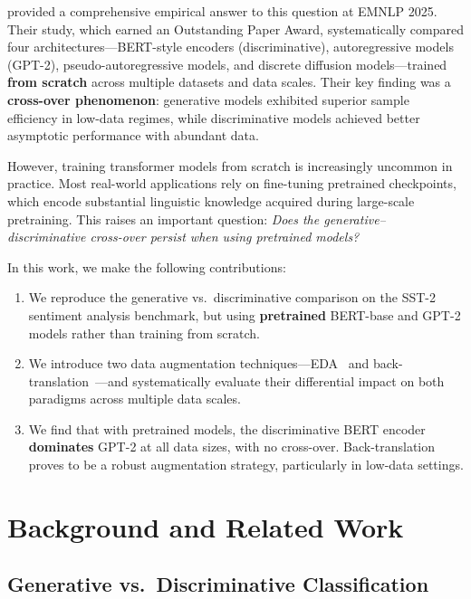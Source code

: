 \documentclass[11pt,a4paper]{article}
\begin{document}
\citet{kasa2025generative} provided a comprehensive empirical answer to this question at EMNLP 2025. Their study, which earned an Outstanding Paper Award, systematically compared four architectures---BERT-style encoders (discriminative), autoregressive models (GPT-2), pseudo-autoregressive models, and discrete diffusion models---trained \textbf{from scratch} across multiple datasets and data scales. Their key finding was a \textbf{cross-over phenomenon}: generative models exhibited superior sample efficiency in low-data regimes, while discriminative models achieved better asymptotic performance with abundant data.

However, training transformer models from scratch is increasingly uncommon in practice. Most real-world applications rely on fine-tuning pretrained checkpoints, which encode substantial linguistic knowledge acquired during large-scale pretraining. This raises an important question: \textit{Does the generative--discriminative cross-over persist when using pretrained models?}

In this work, we make the following contributions:

\begin{enumerate}
    \item We reproduce the generative vs.\ discriminative comparison on the SST-2 sentiment analysis benchmark, but using \textbf{pretrained} BERT-base and GPT-2 models rather than training from scratch.
    \item We introduce two data augmentation techniques---EDA~\cite{wei2019eda} and back-translation~\cite{sennrich2016improving}---and systematically evaluate their differential impact on both paradigms across multiple data scales.
    \item We find that with pretrained models, the discriminative BERT encoder \textbf{dominates} GPT-2 at all data sizes, with no cross-over. Back-translation proves to be a robust augmentation strategy, particularly in low-data settings.
\end{enumerate}

\section{Background and Related Work}

\subsection{Generative vs.\ Discriminative Classification}
\end{document}
